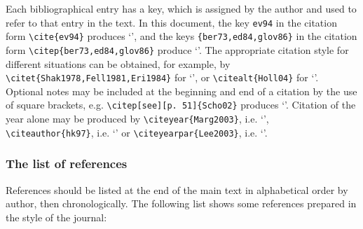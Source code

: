 \documentclass{gCMB2e}
\begin{document}
Each bibliographical entry has a key, which is assigned by the author and used to refer to that entry in the text. In this document, the key \verb"ev94" in the citation form \verb"\cite{ev94}" produces `\cite{ev94}', and the keys \verb"{ber73,ed84,glov86}" in the citation form \verb"\citep{ber73,ed84,glov86}" produce `\citep{ber73,ed84,glov86}'. The appropriate citation style for different situations can be obtained, for example, by \verb"\citet{Shak1978,Fell1981,Eri1984}" for `\citet{Shak1978,Fell1981,Eri1984}', or \verb"\citealt{Holl04}" for `\citealt{Holl04}'. Optional notes may be included at the beginning and end of a citation by the use of square brackets, e.g. \verb"\citep[see][p. 51]{Scho02}" produces `\citep[see][p. 51]{Scho02}'. Citation of the year alone may be produced by \verb"\citeyear{Marg2003}", i.e. `\citeyear{Marg2003}', \verb"\citeauthor{hk97}", i.e. `\citeauthor{hk97}' or \verb"\citeyearpar{Lee2003}", i.e. `\citeyearpar{Lee2003}'.

\subsubsection{The list of references}

References should be listed at the end of the main text in alphabetical order by author, then chronologically. The following list shows some references prepared in the style of the journal:
\end{document}
